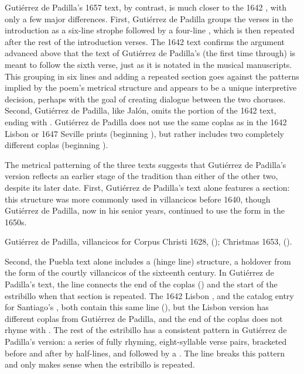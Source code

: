 Gutiérrez de Padilla's 1657 text, by contrast, is much closer to the 1642
, with only a few major differences.
First, Gutiérrez de Padilla groups the verses in the introduction as a six-line
strophe followed by a four-line , which is then repeated after
the rest of the introduction verses.
The 1642 text confirms the argument advanced above that the text of Gutiérrez de
Padilla's  (the first time through) is meant to follow the sixth
verse, just as it is notated in the musical manuscripts.
This grouping in six lines and adding a repeated section goes against the
patterns implied by the poem's metrical structure and appears to be a unique
interpretive decision, perhaps with the goal of creating dialogue between the
two choruses.
Second, Gutiérrez de Padilla, like Jalón, omits the  portion of the
1642 text, ending with .
Gutiérrez de Padilla does not use the same coplas as in the 1642 Lisbon or 1647
Seville prints (beginning ), but rather includes
two completely different coplas (beginning ).

The metrical patterning of the three texts suggests that Gutiérrez de Padilla's
version reflects an earlier stage of the tradition than either of the other
two, despite its later date.
First, Gutiérrez de Padilla's text alone features a  section:
this structure was more commonly used in villancicos before 1640, though
Gutiérrez de Padilla, now in his senior years, continued to use the form in the
1650s.%
\begin{Footnote}
    Gutiérrez de Padilla, villancicos for Corpus Christi 1628,  (); Christmas 1653,  ().
\end{Footnote}
Second, the Puebla text alone includes a  (hinge line)
structure, a holdover from the form of the courtly villancicos of the sixteenth
century.%
    \Autocite{Navarro:Metrica} %
In Gutiérrez de Padilla's text, the line 
connects the end of the coplas () and
the start of the estribillo when that section is repeated.
The 1642 Lisbon , and the catalog entry for Santiago's
, both contain this same line (),
but the Lisbon version has different coplas from Gutiérrez de Padilla, and the
end of the coplas does not rhyme with .
The rest of the estribillo has a consistent pattern in Gutiérrez de Padilla's
version: a series of fully rhyming, eight-syllable verse pairs, bracketed
before and after by half-lines, and followed by a .
The line  breaks this pattern and only makes sense when
the estribillo is repeated. 

